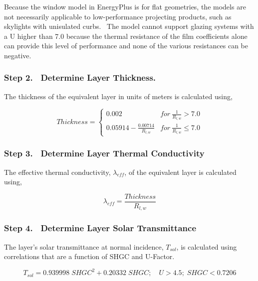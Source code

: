 Because the window model in EnergyPlus is for flat geometries, the models are not necessarily applicable to low-performance projecting products, such as skylights with unisulated curbs.~ The model cannot support glazing systems with a U higher than 7.0 because the thermal resistance of the film coefficients alone can provide this level of performance and none of the various resistances can be negative.

\subsubsection{Step 2.~ Determine Layer Thickness.}\label{step-2.-determine-layer-thickness.}

The thickness of the equivalent layer in units of meters is calculated using,

\begin{equation}
  Thickness = \left\{
                \begin{array}{cl}
                  0.002                             & for~\frac{1}{R_{l,w}} > 7.0 \\
                  0.05914 - \frac{0.00714}{R_{l,w}} & for~\frac{1}{R_{l,w}} \leq 7.0
                \end{array}
              \right.
\end{equation}

\subsubsection{Step 3.~ Determine Layer Thermal Conductivity}\label{step-3.-determine-layer-thermal-conductivity}

The effective thermal conductivity, \({\lambda_{eff}}\), of the equivalent layer is calculated using,

\begin{equation}
{\lambda_{eff}} = \frac{{Thickness}}{{{R_{l,w}}}}
\end{equation}

\subsubsection{Step 4.~ Determine Layer Solar Transmittance}\label{step-4.-determine-layer-solar-transmittance}

The layer's solar transmittance at normal incidence, \({T_{sol}}\), is calculated using correlations that are a function of SHGC and U-Factor.

\begin{equation}
{T_{sol}} = 0.939998\;SHG{C^2} + 0.20332\;SHGC;\quad U > 4.5;\;SHGC < 0.7206
\end{equation}

